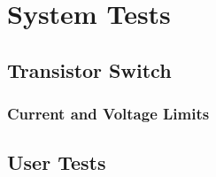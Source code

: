 \chapter{System Tests}

\section{Transistor Switch}

\subsection{Current and Voltage Limits}

\subsection{}

\section{User Tests}
